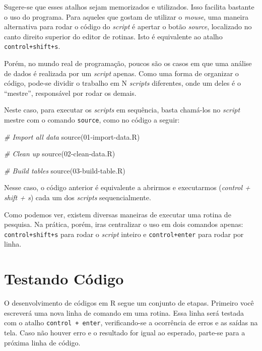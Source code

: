 \documentclass[
  11pt,
]{book}
\newenvironment{Shaded}{\begin{snugshade}}{\end{snugshade}}
\newcommand{\CommentTok}[1]{\textcolor[rgb]{0.37,0.37,0.37}{\textit{#1}}}
\newcommand{\FunctionTok}[1]{\textcolor[rgb]{0,0,0}{#1}}
\newcommand{\NormalTok}[1]{#1}
\newcommand{\StringTok}[1]{\textcolor[rgb]{0.5,0.5,0.5}{#1}}
\begin{document}
Sugere-se que esses atalhos sejam memorizados e utilizados. Isso facilita bastante o uso do programa. Para aqueles que gostam de utilizar o \emph{mouse}, uma maneira alternativa para rodar o código do \emph{script} é apertar o botão \emph{source}, localizado no canto direito superior do editor de rotinas. Isto é equivalente ao atalho \texttt{control+shift+s}.

Porém, no mundo real de programação, poucos são os casos em que uma análise de dados é realizada por um \emph{script} apenas. Como uma forma de organizar o código, pode-se dividir o trabalho em N \emph{scripts} diferentes, onde um deles é o ``mestre'', responsável por rodar os demais.

Neste caso, para executar os \emph{scripts} em sequência, basta chamá-los no \emph{script} mestre com o comando \texttt{source}, como no código a seguir: 

\begin{Shaded}
\begin{Highlighting}[]
\CommentTok{\# Import all data}
\FunctionTok{source}\NormalTok{(}\StringTok{\textquotesingle{}01{-}import{-}data.R\textquotesingle{}}\NormalTok{)}

\CommentTok{\# Clean up}
\FunctionTok{source}\NormalTok{(}\StringTok{\textquotesingle{}02{-}clean{-}data.R\textquotesingle{}}\NormalTok{)}

\CommentTok{\# Build tables}
\FunctionTok{source}\NormalTok{(}\StringTok{\textquotesingle{}03{-}build{-}table.R\textquotesingle{}}\NormalTok{)}
\end{Highlighting}
\end{Shaded}

Nesse caso, o código anterior é equivalente a abrirmos e executarmos (\emph{control + shift + s}) cada um dos \emph{scripts} sequencialmente.

Como podemos ver, existem diversas maneiras de executar uma rotina de pesquisa. Na prática, porém, iras centralizar o uso em dois comandos apenas: \texttt{control+shift+s} para rodar o \emph{script} inteiro e \texttt{control+enter} para rodar por linha.

\hypertarget{testando-cuxf3digo}{%
\section{Testando Código}\label{testando-cuxf3digo}}

O desenvolvimento de códigos em R segue um conjunto de etapas. Primeiro você escreverá uma nova linha de comando em uma rotina. Essa linha será testada com o atalho \texttt{control\ +\ enter}, verificando-se a ocorrência de erros e as saídas na tela. Caso não houver erro e o resultado for igual ao esperado, parte-se para a próxima linha de código.
\end{document}
